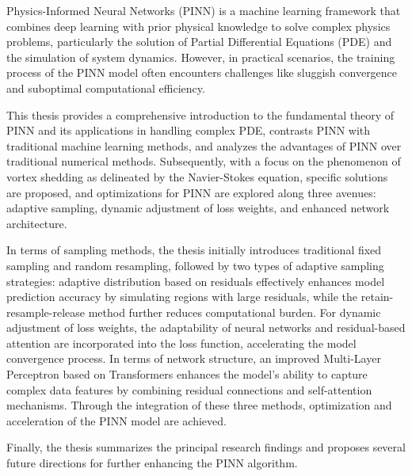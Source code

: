 \begin{abstracten}

Physics-Informed Neural Networks (PINN) is a machine learning framework that combines deep learning with prior physical knowledge to solve complex physics problems, particularly the solution of Partial Differential Equations (PDE) and the simulation of system dynamics. However, in practical scenarios, the training process of the PINN model often encounters challenges like sluggish convergence and suboptimal computational efficiency.

This thesis provides a comprehensive introduction to the fundamental theory of PINN and its applications in handling complex PDE, contrasts PINN with traditional machine learning methods, and analyzes the advantages of PINN over traditional numerical methods. Subsequently, with a focus on the phenomenon of vortex shedding as delineated by the Navier-Stokes equation, specific solutions are proposed, and optimizations for PINN are explored along three avenues: adaptive sampling, dynamic adjustment of loss weights, and enhanced network architecture.
    
In terms of sampling methods, the thesis initially introduces traditional fixed sampling and random resampling, followed by two types of adaptive sampling strategies: adaptive distribution based on residuals effectively enhances model prediction accuracy by simulating regions with large residuals, while the retain-resample-release method further reduces computational burden. For dynamic adjustment of loss weights, the adaptability of neural networks and residual-based attention are incorporated into the loss function, accelerating the model convergence process. In terms of network structure, an improved Multi-Layer Perceptron based on Transformers enhances the model's ability to capture complex data features by combining residual connections and self-attention mechanisms. Through the integration of these three methods, optimization and acceleration of the PINN model are achieved.
    
Finally, the thesis summarizes the principal research findings and proposes several future directions for further enhancing the PINN algorithm.

\end{abstracten}